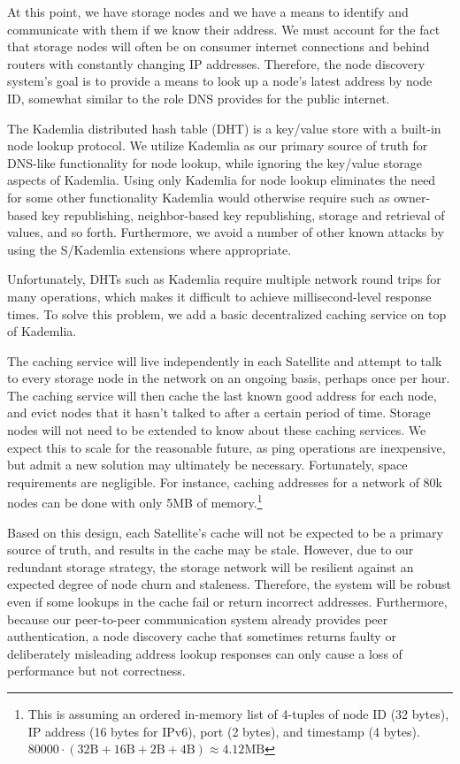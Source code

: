 \documentclass[8pt,fleqn,openany]{book}
\begin{document}
At this point, we have storage nodes and we have a means to identify and
communicate with
them if we know their address. We must account for the fact that storage nodes
will often be on consumer internet connections and behind routers with
constantly changing IP
addresses. Therefore, the node discovery system's goal is to provide a means to look
up a node's latest address by node ID, somewhat similar to the role DNS
provides for the public internet.

The Kademlia distributed hash table (DHT) is a key/value store with a built-in
node lookup protocol.
We utilize Kademlia as our primary source of truth for DNS-like
functionality for node lookup, while ignoring the key/value storage aspects of
Kademlia.
Using only Kademlia for node lookup eliminates the need for some other
functionality Kademlia would otherwise require such as owner-based key
republishing, neighbor-based key republishing, storage and retrieval of values,
and so forth. Furthermore, we avoid a number of other known attacks by using the
S/Kademlia \cite{skad} extensions where appropriate.

Unfortunately, DHTs such as Kademlia require multiple network
round trips for many operations, which makes it difficult to achieve
millisecond-level response times. To solve this problem, we add a basic
decentralized caching service on top of Kademlia.

The caching service will live independently in each Satellite and
attempt to talk to every storage node in the network
on an ongoing basis, perhaps once per hour.
The caching service will then cache
the last known good address for each node, and evict nodes that it hasn't talked
to after a certain period of time.
Storage nodes will not need to be extended to know about these caching services.
We expect this to scale for the
reasonable future, as ping operations are inexpensive, but admit a new solution
may ultimately be necessary.
Fortunately, space requirements are negligible. For instance, caching addresses
for a network of 80k nodes
can be done with only 5MB of memory.\footnote{
This is assuming an ordered in-memory list of 4-tuples of node ID (32 bytes),
IP address (16 bytes for IPv6), port (2 bytes), and timestamp (4 bytes).
$80000\cdot(32 \mbox{B}+16 \mbox{B}+2 \mbox{B}+4 \mbox{B}) \approx 4.12 \mbox{MB}$
}

Based on this design, each Satellite's cache will not be expected to be a primary source
of truth, and results in the cache may be stale. However, due to our redundant
storage strategy, the storage network will be resilient against an expected
degree of node churn and staleness.
Therefore, the system will be robust even if some lookups in the cache
fail or return incorrect addresses.
Furthermore, because our peer-to-peer communication
system already provides peer authentication, a node discovery cache that
sometimes returns faulty
or deliberately misleading address lookup responses can only cause a
loss of performance but not correctness.
\end{document}

